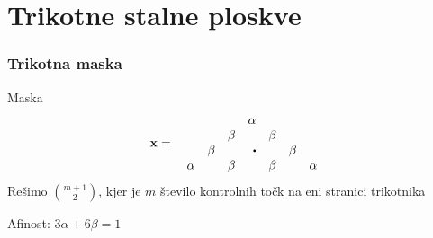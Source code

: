 \documentclass{beamer}
\newcommand\sbullet[1][.5]{\mathbin{\vcenter{\hbox{\scalebox{#1}{$\bullet$}}}}}
\begin{document}
\section{Trikotne stalne ploskve}


\begin{frame}
    \frametitle{Trikotna maska}
    \begin{block}{Maska}
    $$
    \mathbf{x} =  \quad 
    \begin{matrix*}[r]
            &       &       & \alpha   &       &       & \\
            &       & \beta &          & \beta &       & \\
            & \beta &       & \sbullet &       & \beta & \\
    \alpha &       & \beta &          & \beta &       & \alpha
    \end{matrix*}
    $$
    Rešimo $\binom{m+1}{2}$, kjer je $m$ število kontrolnih točk 
    na eni stranici trikotnika

    Afinost: $3\alpha + 6\beta = 1$
    \end{block}
\end{frame}
\end{document}
